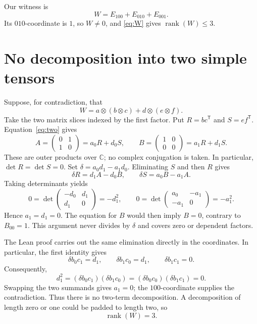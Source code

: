 \documentclass[11pt,a4paper]{article}
\newcommand{\C}{\mathbb C}
\newcommand{\rk}{\operatorname{rank}}
\begin{document}
Our witness is
\begin{equation}\label{eq:W}
W=E_{100}+E_{010}+E_{001}.
\end{equation}
Its $010$-coordinate is $1$, so $W\ne0$, and \eqref{eq:W} gives $\rk(W)\le3$.

\newpage
\section{No decomposition into two simple tensors}
Suppose, for contradiction, that
\begin{equation}\label{eq:two}
W=a\otimes(b\otimes c)+d\otimes(e\otimes f).
\end{equation}
Take the two matrix slices indexed by the first factor. Put $R=bc^{\mathsf T}$ and $S=ef^{\mathsf T}$. Equation~\eqref{eq:two} gives
\[
A=\begin{pmatrix}0&1\\1&0\end{pmatrix}=a_0R+d_0S,
\qquad
B=\begin{pmatrix}1&0\\0&0\end{pmatrix}=a_1R+d_1S.
\]
These are outer products over $\C$; no complex conjugation is taken. In particular, $\det R=\det S=0$. Set $\delta=a_0d_1-a_1d_0$. Eliminating $S$ and then $R$ gives
\[
\delta R=d_1A-d_0B,\qquad
\delta S=a_0B-a_1A.
\]
Taking determinants yields
\[
0=\det\!\begin{pmatrix}-d_0&d_1\\d_1&0\end{pmatrix}=-d_1^2,
\qquad
0=\det\!\begin{pmatrix}a_0&-a_1\\-a_1&0\end{pmatrix}=-a_1^2.
\]
Hence $a_1=d_1=0$. The equation for $B$ would then imply $B=0$, contrary to $B_{00}=1$. This argument never divides by $\delta$ and covers zero or dependent factors.

The Lean proof carries out the same elimination directly in the coordinates. In particular, the first identity gives
\[
\delta b_0c_1=d_1,\qquad \delta b_1c_0=d_1,\qquad \delta b_1c_1=0.
\]
Consequently,
\[
d_1^2=(\delta b_0c_1)(\delta b_1c_0)
=(\delta b_0c_0)(\delta b_1c_1)=0.
\]
Swapping the two summands gives $a_1=0$; the $100$-coordinate supplies the contradiction. Thus there is no two-term decomposition. A decomposition of length zero or one could be padded to length two, so
\begin{equation}\label{eq:rank}
\boxed{\rk(W)=3.}
\end{equation}
\end{document}
